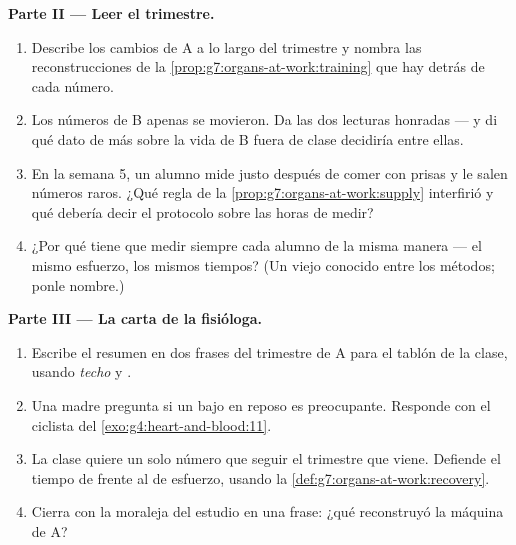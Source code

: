 \begin{problem}
\medskip\noindent\textbf{Parte II --- Leer el trimestre.}
\begin{enumerate}[resume]
  \item Describe los cambios de A a lo largo del trimestre y nombra las
        reconstrucciones de la \cref{prop:g7:organs-at-work:training}
        que hay detrás de cada número.
  \item Los números de B apenas se movieron. Da las dos lecturas
        honradas --- y di qué dato de más sobre la vida de B fuera de
        clase decidiría entre ellas.
  \item En la semana 5, un alumno mide justo después de comer con
        prisas y le salen números raros. ¿Qué regla de la
        \cref{prop:g7:organs-at-work:supply} interfirió y qué debería
        decir el protocolo sobre las horas de medir?
  \item ¿Por qué tiene que medir siempre cada alumno de la misma manera
        --- el mismo esfuerzo, los mismos tiempos? (Un viejo conocido
        entre los métodos; ponle nombre.)
\end{enumerate}

\medskip\noindent\textbf{Parte III --- La carta de la fisióloga.}
\begin{enumerate}[resume]
  \item Escribe el resumen en dos frases del trimestre de A para el
        tablón de la clase, usando \emph{techo} y \emph{}.
  \item Una madre pregunta si un  bajo en reposo es preocupante.
        Responde con el ciclista del
        \cref{exo:g4:heart-and-blood:11}.
  \item La clase quiere un solo número que seguir el trimestre que
        viene. Defiende el tiempo de  frente al  de
        esfuerzo, usando la \cref{def:g7:organs-at-work:recovery}.
  \item Cierra con la moraleja del estudio en una frase: ¿qué
        reconstruyó la máquina de A?
\end{enumerate}
\end{problem}
